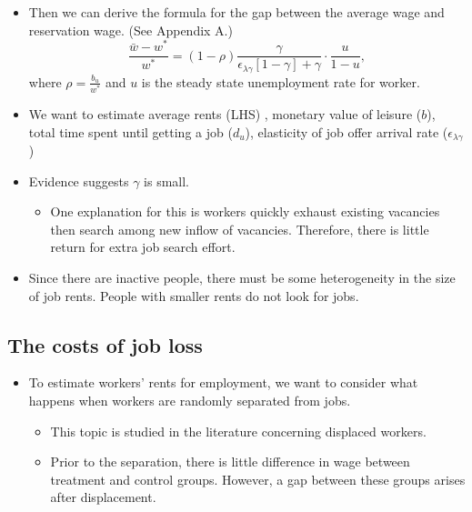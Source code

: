 \documentclass[a4paper, 12pt]{article}
\begin{document}
\begin{itemize}
\item Then we can derive the formula for the gap between the average wage and reservation wage. (See Appendix A.)
\begin{equation}
\frac{\bar{w}-w^*}{w^*}
=
(1-\rho)
\frac{\gamma}{\epsilon_{\lambda \gamma}[1-\gamma]+\gamma}
\cdot
\frac{u}{1-u},
\end{equation}
where $\rho =  \frac{b_u}{w^*}$ and $u$ is the steady state unemployment rate for worker.

\item We want to estimate average rents (LHS) , monetary value of leisure ($b$), total time spent until getting a job ($d_u$), elasticity of job offer arrival rate ($\epsilon_{\lambda \gamma}$)


\item Evidence suggests $\gamma$ is small. 
\begin{itemize}
\item One explanation for this is workers quickly exhaust existing vacancies then search among new inflow of vacancies. Therefore, there is little return for extra job search effort.
\end{itemize}
\item Since there are inactive people, there must be some heterogeneity in the size of job rents. People with smaller rents do not look for jobs.
\end{itemize}
\subsection{The costs of job loss}
\begin{itemize}
\item To estimate workers' rents for employment, we want to consider what happens  when workers are randomly separated from jobs.
\begin{itemize}
\item This topic is studied in the literature concerning displaced workers.
\item Prior to the separation, there is little difference in wage between treatment and control groups. However, a gap between these groups arises after displacement.
\end{itemize}
\end{itemize}
\end{document}
